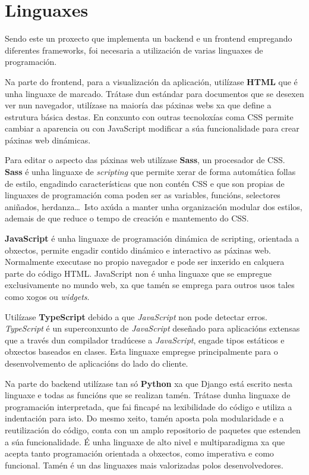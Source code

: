 \section{Linguaxes}
Sendo este un proxecto que implementa un backend e un frontend empregando diferentes frameworks, foi necesaria a utilización de varias linguaxes de programación.

Na parte do frontend, para a visualización da aplicación, utilízase \textbf{\acrfull{HTML}} que é unha linguaxe de marcado. Trátase dun estándar para documentos que se desexen ver nun navegador, utilízase na maioría das páxinas webs xa que define a estrutura básica destas. En conxunto con outras tecnoloxías coma \acrfull{CSS} permite cambiar a aparencia ou con JavaScript modificar a súa funcionalidade para crear páxinas web dinámicas.

Para editar o aspecto das páxinas web utilízase \textbf{Sass}, un procesador de \acrshort{CSS}. \textbf{Sass} é unha linguaxe de \textit{scripting} que permite xerar de forma automática follas de estilo, engadindo características que non contén \acrshort{CSS} e que son propias de linguaxes de programación coma poden ser as variables, funcións, selectores aniñados, herdanza\dots~Isto axúda a manter unha organización modular dos estilos, ademais de que reduce o tempo de creación e mantemento do CSS.

\textbf{JavaScript} é unha linguaxe de programación dinámica de scripting, orientada a obxectos, permite engadir contido dinámico e interactivo as páxinas web. Normalmente executase no propio navegador e pode ser inxerido en calquera parte do código \acrshort{HTML}. JavaScript non é unha linguaxe que se empregue exclusivamente no mundo web, xa que tamén se emprega para outros usos tales como xogos ou \textit{widgets}.

Utilízase \textbf{TypeScript} debido a que \textit{JavaScript} non pode detectar erros. \textit{TypeScript} é un superconxunto de \textit{JavaScript} deseñado para aplicacións extensas que a través dun compilador tradúcese a \textit{JavaScript}, engade tipos estáticos e obxectos baseados en clases. Esta linguaxe empregse principalmente para o desenvolvemento de aplicacións do lado do cliente.

Na parte do backend utilízase tan só \textbf{Python} xa que Django está escrito nesta linguaxe e todas as funcións que se realizan tamén. Trátase dunha linguaxe de programación interpretada, que fai fincapé na lexibilidade do código e utiliza a indentación para isto. Do mesmo xeito, tamén aposta pola modularidade e a reutilización do código, conta con un amplo repositorio de paquetes que estenden a súa funcionalidade. É unha linguaxe de alto nivel e multiparadigma xa que acepta tanto programación orientada a obxectos, como imperativa e como funcional. Tamén é un das linguaxes mais valorizadas polos desenvolvedores.

